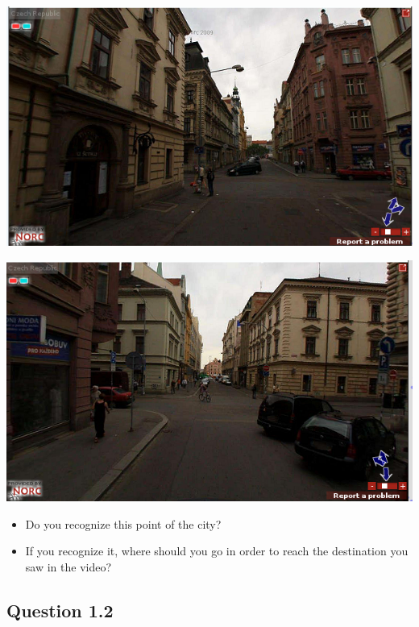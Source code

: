 \documentclass[12pt,a4paper,openright, notitlepage]{report}
\begin{document}
\includegraphics[width=\textwidth]{imgs/image-question11-1}

\includegraphics[width=\textwidth]{imgs/image-question11-2}

\begin{itemize}
	\item Do you recognize this point of the city?
	\item If you recognize it, where should you go in order to reach the destination you saw in the video?
\end{itemize}

\newpage

\subsection{Question 1.2}
\end{document}
